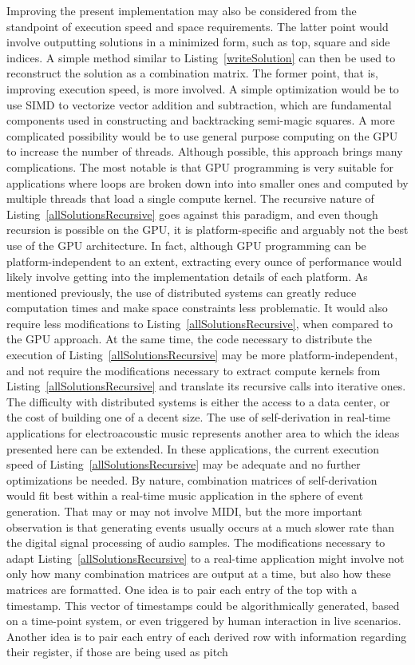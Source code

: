 Improving the present implementation may also be considered from the standpoint of execution speed and space requirements. The latter point would involve outputting solutions in a minimized form, such as top, square and side indices. A simple method similar to Listing~\ref{writeSolution} can then be used to reconstruct the solution as a combination matrix. The former point, that is, improving execution speed, is more involved. A simple optimization would be to use SIMD to vectorize vector addition and subtraction, which are fundamental components used in constructing and backtracking semi-magic squares. A more complicated possibility would be to use general purpose computing on the GPU to increase the number of threads. Although possible, this approach brings many complications. The most notable is that GPU programming is very suitable for applications where loops are broken down into into smaller ones and computed by multiple threads that load a single compute kernel. The recursive nature of Listing~\ref{allSolutionsRecursive} goes against this paradigm, and even though recursion is possible on the GPU, it is platform-specific and arguably not the best use of the GPU architecture. In fact, although GPU programming can be platform-independent to an extent, extracting every ounce of performance would likely involve getting into the implementation details of each platform. As mentioned previously, the use of distributed systems can greatly reduce computation times and make space constraints less problematic. It would also require less modifications to Listing~\ref{allSolutionsRecursive}, when compared to the GPU approach. At the same time, the code necessary to distribute the execution of Listing~\ref{allSolutionsRecursive} may be more platform-independent, and not require the modifications necessary to extract compute kernels from Listing~\ref{allSolutionsRecursive} and translate its recursive calls into iterative ones. The difficulty with distributed systems is either the access to a data center, or the cost of building one of a decent size. The use of self-derivation in real-time applications for electroacoustic music represents another area to which the ideas presented here can be extended. In these applications, the current execution speed of Listing~\ref{allSolutionsRecursive} may be adequate and no further optimizations be needed. By nature, combination matrices of self-derivation would fit best within a real-time music application in the sphere of event generation. That may or may not involve MIDI, but the more important observation is that generating events usually occurs at a much slower rate than the digital signal processing of audio samples. The modifications necessary to adapt Listing~\ref{allSolutionsRecursive} to a real-time application might involve not only how many combination matrices are output at a time, but also how these matrices are formatted. One idea is to pair each entry of the top with a timestamp. This vector of timestamps could be algorithmically generated, based on a time-point system, or even triggered by human interaction in live scenarios. Another idea is to pair each entry of each derived row with information regarding their register, if those are being used as pitch 